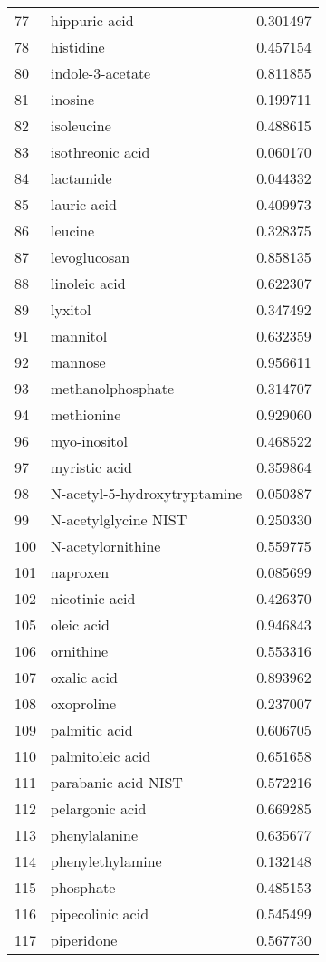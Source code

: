 \begin{tabular}{llr}
77 & hippuric acid & 0.301497 \\
78 & histidine & 0.457154 \\
80 & indole-3-acetate & 0.811855 \\
81 & inosine & 0.199711 \\
82 & isoleucine & 0.488615 \\
83 & isothreonic acid & 0.060170 \\
84 & lactamide & 0.044332 \\
85 & lauric acid & 0.409973 \\
86 & leucine & 0.328375 \\
87 & levoglucosan & 0.858135 \\
88 & linoleic acid & 0.622307 \\
89 & lyxitol & 0.347492 \\
91 & mannitol & 0.632359 \\
92 & mannose & 0.956611 \\
93 & methanolphosphate & 0.314707 \\
94 & methionine & 0.929060 \\
96 & myo-inositol & 0.468522 \\
97 & myristic acid & 0.359864 \\
98 & N-acetyl-5-hydroxytryptamine & 0.050387 \\
99 & N-acetylglycine NIST & 0.250330 \\
100 & N-acetylornithine & 0.559775 \\
101 & naproxen & 0.085699 \\
102 & nicotinic acid & 0.426370 \\
105 & oleic acid & 0.946843 \\
106 & ornithine & 0.553316 \\
107 & oxalic acid & 0.893962 \\
108 & oxoproline & 0.237007 \\
109 & palmitic acid & 0.606705 \\
110 & palmitoleic acid & 0.651658 \\
111 & parabanic acid NIST & 0.572216 \\
112 & pelargonic acid & 0.669285 \\
113 & phenylalanine & 0.635677 \\
114 & phenylethylamine & 0.132148 \\
115 & phosphate & 0.485153 \\
116 & pipecolinic acid & 0.545499 \\
117 & piperidone & 0.567730 \\

\end{tabular}
